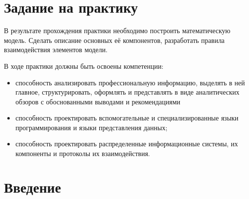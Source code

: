 \section{Задание на практику}
	В результате прохождения практики необходимо построить математическую модель.
		Сделать описание основных её компонентов, разработать правила взаимодействия 
		элементов модели.

	В ходе практики должны быть освоены компетенции:
		\begin{itemize}
			\item способность анализировать профессиональную информацию, выделять в ней главное, структурировать, оформлять и представлять в виде аналитических обзоров с обоснованными выводами и рекомендациями
			\item способность проектировать вспомогательные и специализированные языки программирования и языки представления данных;
			\item способность проектировать распределенные информационные системы, их компоненты и протоколы их взаимодействия.
		\end{itemize}

\newpage
\section{Введение}
